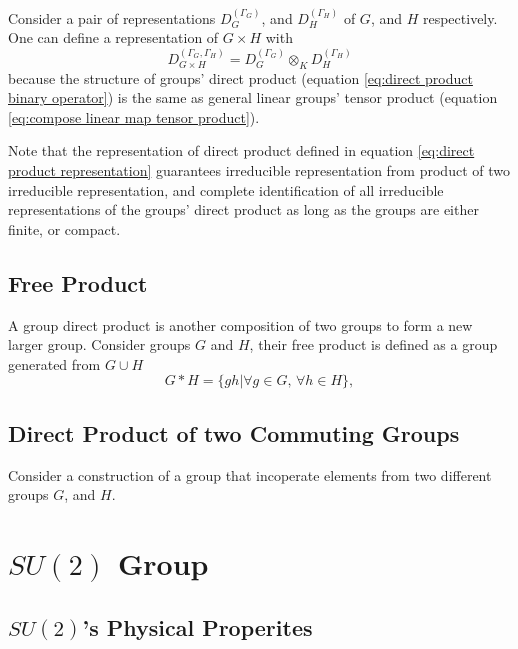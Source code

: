 \documentclass[preprint, 12pt]{revtex4-2}
\numberwithin{equation}{section}
\begin{document}
Consider a pair of representations $D^{(\Gamma_G)}_G$, and $D^{(\Gamma_H)}_H$ of $G$, and $H$ respectively. One can define a representation of $G\times H$ with
\begin{equation}\label{eq:direct product representation}
    D^{(\Gamma_G,\Gamma_H)}_{G\times H} = D^{(\Gamma_G)}_G\otimes_K D^{(\Gamma_H)}_H
\end{equation}
because the structure of groups' direct product (equation \ref{eq:direct product binary operator}) is the same as general linear groups' tensor product (equation \ref{eq:compose linear map tensor product}).

Note that the representation of direct product defined in equation \ref{eq:direct product representation} guarantees irreducible representation from product of two irreducible representation, and complete identification of all irreducible representations of the groups' direct product as long as the groups are either finite, or compact.  

\subsection{Free Product}
A group direct product is another composition of two groups to form a new larger group. Consider groups $G$ and $H$, their free product is defined as a group generated from $G\cup H$
\begin{equation}\label{eq:Free product}
    G\ast H = \{gh|\forall g\in G,\, \forall h\in H\},
\end{equation}

\subsection{Direct Product of two Commuting Groups}
Consider a construction of a group that incoperate elements from two different groups $G$, and $H$. 

\newpage
\section{$SU(2)$ Group}

\subsection{$SU(2)$'s Physical Properites}
\end{document}

